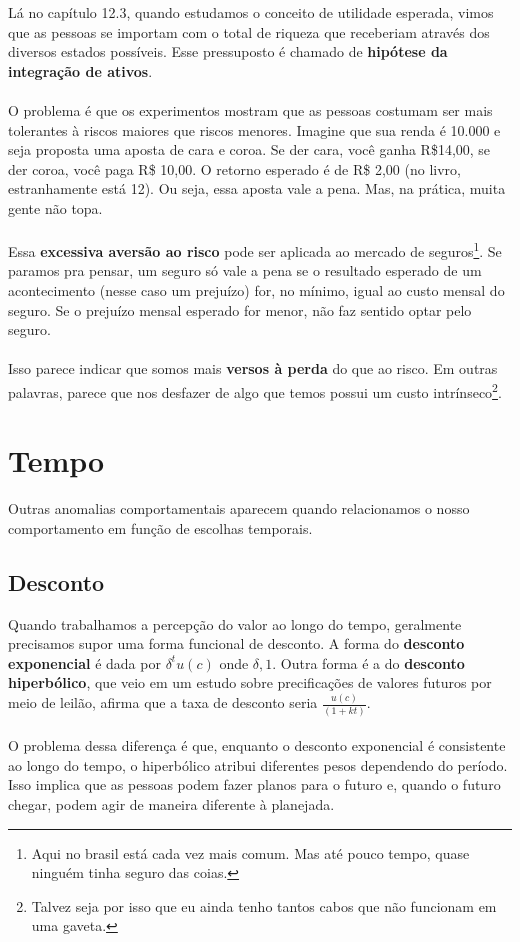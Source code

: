\documentclass[a4paper,11pt,oneside]{book}
\theoremstyle{definition}
\theoremstyle{break}
\begin{document}
Lá no capítulo 12.3, quando estudamos o conceito de utilidade esperada, vimos que as pessoas se importam com o total de riqueza que receberiam através dos diversos estados possíveis. Esse pressuposto é chamado de \textbf{hipótese da integração de ativos}.
\\
\\
O problema é que os experimentos mostram que as pessoas costumam ser mais tolerantes à riscos maiores que riscos menores. Imagine que sua renda é 10.000 e  seja proposta uma aposta de cara e coroa. Se der cara, você ganha R\$14,00, se der coroa, você paga R\$ 10,00. O retorno esperado é de R\$ 2,00 (no livro, estranhamente está 12). Ou seja, essa aposta vale a pena. Mas, na prática, muita gente não topa.
\\
\\
Essa \textbf{excessiva aversão ao risco} pode ser aplicada ao mercado de seguros\footnote{Aqui no brasil está cada vez mais comum. Mas até pouco tempo, quase ninguém tinha seguro das coias.}. Se paramos pra pensar, um seguro só vale a pena se o resultado esperado de um acontecimento (nesse caso um prejuízo) for, no mínimo, igual ao custo mensal do seguro. Se o prejuízo mensal esperado for menor, não faz sentido optar pelo seguro.
\\
\\
Isso parece indicar que somos mais \textbf{versos à perda} do que ao risco. Em outras palavras, parece que nos desfazer de algo que temos possui um custo intrínseco\footnote{Talvez seja por isso que eu ainda tenho tantos cabos que não funcionam em uma gaveta.}.

\section{Tempo}

Outras anomalias comportamentais aparecem quando relacionamos o nosso comportamento em função de escolhas temporais.

\subsection{Desconto}

Quando trabalhamos a percepção do valor ao longo do tempo, geralmente precisamos supor uma forma funcional de desconto. A forma do \textbf{desconto exponencial} é dada por $\delta^t u(c)$ onde $\delta , 1$. Outra forma é a do \textbf{desconto hiperbólico}, que veio em um estudo sobre precificações de valores futuros por meio de leilão, afirma que a taxa de desconto seria $\frac{u(c)}{(1+kt)}$.
\\
\\
O problema dessa diferença é que, enquanto o desconto exponencial é consistente ao longo do tempo, o hiperbólico atribui diferentes pesos dependendo do período. Isso implica que as pessoas podem fazer planos para o futuro e, quando o futuro chegar, podem agir de maneira diferente à planejada.
\end{document}
